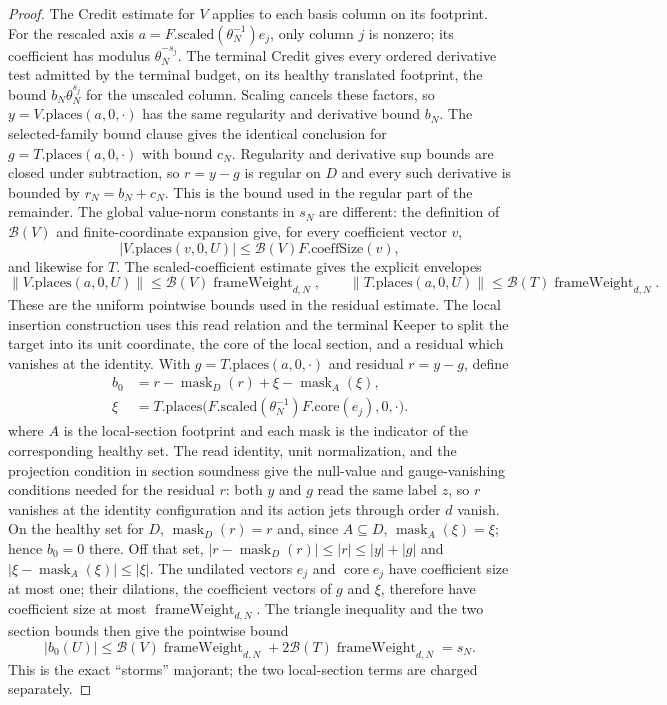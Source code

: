 \begin{proof}
The Credit estimate for $V$ applies to each basis column on its footprint.
For the rescaled axis $a=F.\mathrm{scaled}(\theta_N^{-1})e_j$, only column
$j$ is nonzero; its coefficient has modulus $\theta_N^{-s_j}$. The
terminal Credit gives every ordered derivative test admitted by the
terminal budget, on its healthy translated footprint, the bound
$b_N\theta_N^{s_j}$ for the unscaled column. Scaling cancels these factors,
so $y=V.\mathrm{places}(a,0,\cdot)$ has the same regularity and derivative
bound $b_N$. The selected-family bound clause gives the identical
conclusion for $g=T.\mathrm{places}(a,0,\cdot)$ with bound $c_N$.
Regularity and derivative sup bounds are closed under subtraction, so
$r=y-g$ is regular on $D$ and every such derivative is bounded by
$r_N=b_N+c_N$. This is the bound used in the regular part of the
remainder. The global value-norm constants in $s_N$ are different: the
definition of $\mathcal B(V)$ and finite-coordinate expansion
give, for every coefficient vector $v$,
\[
 |V.\mathrm{places}(v,0,U)|
 \leq\mathcal B(V)F.\mathrm{coeffSize}(v),
\]
and likewise for $T$. The scaled-coefficient estimate gives the explicit
envelopes
\[
 \|V.\mathrm{places}(a,0,U)\|
       \leq\mathcal B(V)\operatorname{frameWeight}_{d,N},\qquad
 \|T.\mathrm{places}(a,0,U)\|
       \leq\mathcal B(T)\operatorname{frameWeight}_{d,N}.
\]
These are the uniform pointwise bounds used in the residual estimate. The local insertion
construction uses this read relation and the terminal Keeper to split the
target into its unit coordinate, the core of the local section, and a
residual which vanishes at the identity. With
$g=T.\mathrm{places}(a,0,\cdot)$ and residual $r=y-g$, define
\begin{align*}
 b_0&=r-\operatorname{mask}_{D}(r)
          +\xi-\operatorname{mask}_{A}(\xi),\\
 \xi&=T.\mathrm{places}\bigl(
       F.\mathrm{scaled}(\theta_N^{-1})F.\mathrm{core}(e_j),0,\cdot\bigr).
\end{align*}
where $A$ is the local-section footprint and each mask is the indicator of
the corresponding healthy set. The read identity, unit normalization, and
the projection condition in section soundness give the null-value and
gauge-vanishing conditions needed for the residual $r$: both $y$ and $g$
read the same label $z$, so $r$ vanishes at the identity configuration
and its action jets through order $d$ vanish. On the healthy set for $D$,
$\operatorname{mask}_D(r)=r$ and, since $A\subseteq D$,
$\operatorname{mask}_A(\xi)=\xi$; hence $b_0=0$ there. Off that set,
$|r-\operatorname{mask}_D(r)|\leq|r|\leq|y|+|g|$ and
$|\xi-\operatorname{mask}_A(\xi)|\leq|\xi|$. The undilated vectors $e_j$
and $\operatorname{core}e_j$ have coefficient size at most one; their
dilations, the coefficient vectors of $g$ and $\xi$, therefore have
coefficient size at most $\operatorname{frameWeight}_{d,N}$. The triangle
inequality and the two section
bounds then give the pointwise bound
\[
 |b_0(U)|\leq \mathcal B(V)\operatorname{frameWeight}_{d,N}
   +2\mathcal B(T)\operatorname{frameWeight}_{d,N}=s_N.
\]
This is the exact ``storms'' majorant; the two local-section terms are
charged separately.


\end{proof}
